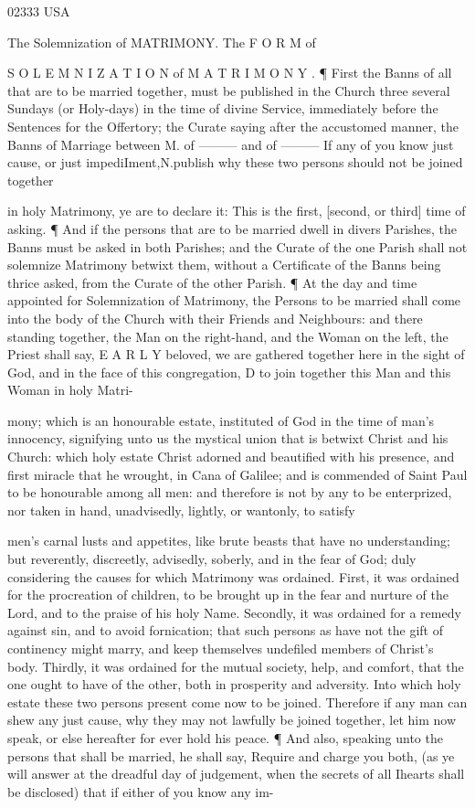 02333 USA

The Solemnization of MATRIMONY. The F O R M of

S O L E M N I Z A T I O N of M A T R I M O N Y . ¶ First the Banns of all that are to be married together, must be published in the Church three several Sundays (or Holy-days) in the time of divine Service, immediately before the Sentences for the Offertory; the Curate saying after the accustomed manner, the Banns of Marriage between M. of ——— and of ——— If any of you know just cause, or just impediIment,N.publish why these two persons should not be joined together

in holy Matrimony, ye are to declare it: This is the first, [second, or third] time of asking. ¶ And if the persons that are to be married dwell in divers Parishes, the Banns must be asked in both Parishes; and the Curate of the one Parish shall not solemnize Matrimony betwixt them, without a Certificate of the Banns being thrice asked, from the Curate of the other Parish. ¶ At the day and time appointed for Solemnization of Matrimony, the Persons to be married shall come into the body of the Church with their Friends and Neighbours: and there standing together, the Man on the right-hand, and the Woman on the left, the Priest shall say, E A R L Y beloved, we are gathered together here in the sight of God, and in the face of this congregation, D to join together this Man and this Woman in holy Matri-

mony; which is an honourable estate, instituted of God in the time of man’s innocency, signifying unto us the mystical union that is betwixt Christ and his Church: which holy estate Christ adorned and beautified with his presence, and first miracle that he wrought, in Cana of Galilee; and is commended of Saint Paul to be honourable among all men: and therefore is not by any to be enterprized, nor taken in hand, unadvisedly, lightly, or wantonly, to satisfy

men’s carnal lusts and appetites, like brute beasts that have no understanding; but reverently, discreetly, advisedly, soberly, and in the fear of God; duly considering the causes for which Matrimony was ordained. First, it was ordained for the procreation of children, to be brought up in the fear and nurture of the Lord, and to the praise of his holy Name. Secondly, it was ordained for a remedy against sin, and to avoid fornication; that such persons as have not the gift of continency might marry, and keep themselves undefiled members of Christ’s body. Thirdly, it was ordained for the mutual society, help, and comfort, that the one ought to have of the other, both in prosperity and adversity. Into which holy estate these two persons present come now to be joined. Therefore if any man can shew any just cause, why they may not lawfully be joined together, let him now speak, or else hereafter for ever hold his peace. ¶ And also, speaking unto the persons that shall be married, he shall say, Require and charge you both, (as ye will answer at the dreadful day of judgement, when the secrets of all Ihearts shall be disclosed) that if either of you know any im-

